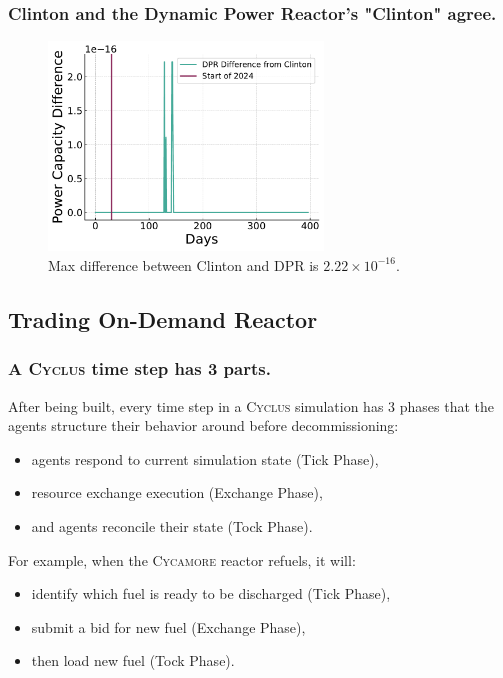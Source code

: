 \documentclass[9pt]{beamer}
\newcommand{\cycamore}{\textsc{Cycamore}\xspace}
\newcommand{\cyclus}{\textsc{Cyclus}\xspace}
\begin{document}

\begin{frame}
  \frametitle{Clinton and the Dynamic Power Reactor's "Clinton" agree.}
  \begin{figure}
    \centering
    \includegraphics[width=0.65\textwidth]{images/dpr_diff.pdf}
    \caption{Max difference between Clinton and DPR is $2.22 \times 10^{-16}$.}
  \end{figure}
\end{frame}


\subsection{Trading On-Demand Reactor}
\begin{frame}
  \frametitle{A \cyclus time step has 3 parts.}
  After being built, every time step in a \cyclus simulation has 3 phases that the agents structure their behavior around before decommissioning:
  \begin{itemize}
    \item agents respond to current simulation state (Tick Phase), \pause
    \item resource exchange execution (Exchange Phase), \pause
    \item and agents reconcile their state (Tock Phase). \pause
  \end{itemize}
  \vspace{5pt}
  For example, when the \cycamore reactor refuels, it will: \pause
  \begin{itemize}[<+->]
    \item identify which fuel is ready to be discharged (Tick Phase),
    \item submit a bid for new fuel (Exchange Phase),
    \item then load new fuel (Tock Phase).
  \end{itemize}
\end{frame}
\end{document}
